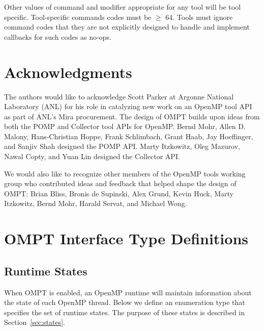 \documentclass{article}
\begin{document}
Other values of command  and modifier appropriate for any tool will be tool specific. Tool-specific commands codes must be $\geq$ 64. Tools must ignore command codes that they are not explicitly designed to handle and implement callbacks for such codes as no-ops.

\section*{Acknowledgments}

The authors would like to acknowledge Scott Parker at Argonne National Laboratory (ANL) for 
his role in catalyzing new work on an OpenMP tool API as part of ANL's Mira procurement.
The design of OMPT builds upon ideas from both the POMP and Collector tool APIs for OpenMP. 
Bernd Mohr, Allen D. Malony, Hans-Christian Hoppe, Frank Schlimbach, 
Grant Haab, Jay Hoeflinger, and Sanjiv Shah designed the POMP API. 
Marty Itzkowitz, Oleg Mazurov, Nawal Copty, and Yuan Lin designed the Collector API.

We would also like to recognize other members of the OpenMP tools working group who contributed ideas and feedback that helped shape the design of  OMPT: Brian Bliss, Bronis de Supinski, Alex Grund, Kevin Huck, Marty Itzkowitz, Bernd Mohr, Harald Servat, and Michael Wong.

 
 


\appendix
\clearpage


\section{OMPT Interface Type Definitions}
\label{appendix:ompt-types}
\subsection{Runtime States}
\label{appendix:ompt-types:states}

When OMPT is enabled, an OpenMP runtime will maintain information about the state of  each OpenMP thread. 
Below we define an enumeration type that specifies the set of runtime states. 
The purpose of these states is described in Section~\ref{sec:states}.
\end{document}
